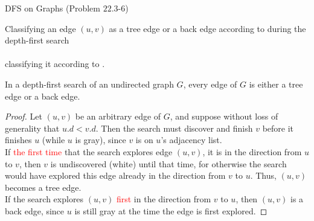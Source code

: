 \begin{frame}{}
  \begin{exampleblock}{DFS on  Graphs (Problem $22.3$-$6$)}
    \begin{center}
      Classifying an edge $(u,v)$ as a tree edge or a back edge 
      according to  during the depth-first search \\[6pt] 

       \\[6pt]
      
      classifying it according to .
    \end{center}
  \end{exampleblock}

\end{frame}

\begin{frame}{}
  \begin{theorem}[Theorem $22.10$]
    In a depth-first search of an undirected graph $G$, 
    every edge of $G$ is either a tree edge or a back edge.
  \end{theorem}

  \begin{proof}
    Let $(u,v)$ be an arbitrary edge of $G$, 
    and suppose without loss of generality that $u.d < v.d$. 
    Then the search must discover and finish $v$ before it finishes $u$
    (while $u$ is gray), since $v$ is on $u$’s adjacency list. \\[6pt]

    If \textcolor<2->{red}{the first time} that the search explores edge $(u,v)$, 
    it is in the direction from $u$ to $v$, 
    then $v$ is undiscovered (white) until that time, 
    for otherwise the search would have explored this edge
    already in the direction from $v$ to $u$. 
    Thus, $(u,v)$ becomes a tree edge. \\[6pt]
    
    If the search explores $(u,v)$ \textcolor<2->{red}{first} in the direction from $v$ to $u$, 
    then $(u,v)$ is a back edge,
    since $u$ is still gray at the time the edge is first explored.
  \end{proof}
\end{frame}

